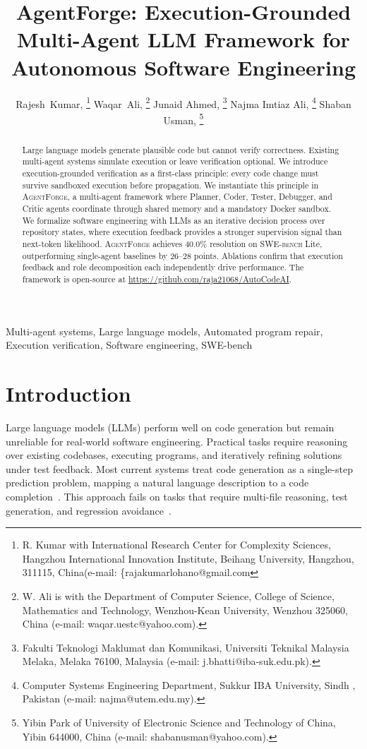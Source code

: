\documentclass[journal]{IEEEtran}
\title{AgentForge: Execution-Grounded Multi-Agent LLM Framework for Autonomous Software Engineering}
\author{
    Rajesh~Kumar, %
    \thanks{R. Kumar with International Research Center for Complexity Sciences, Hangzhou International Innovation Institute, Beihang University, Hangzhou, 311115, China(e-mail: \{rajakumarlohano@gmail.com}%
    Waqar~Ali, %
    \thanks{W. Ali is with the Department of Computer Science, College of Science, Mathematics and Technology, Wenzhou-Kean University, Wenzhou 325060, China (e-mail: waqar.uestc@yahoo.com).}%
    Junaid Ahmed,
     \thanks{Fakulti Teknologi Maklumat dan Komunikasi, 
Universiti Teknikal Malaysia Melaka, Melaka 76100, Malaysia (e-mail:  j.bhatti@iba-suk.edu.pk).}
    Najma Imtiaz Ali,
     \thanks{Computer Systems Engineering Department, Sukkur IBA University, Sindh , Pakistan (e-mail:  najma@utem.edu.my).}
Shaban Usman,
     \thanks{Yibin Park of University of Electronic Science and Technology of China, Yibin 644000, China (e-mail:  shabanusman@yahoo.com).}


}
\newcommand{\agentforge}{\textsc{AgentForge}}
\newcommand{\swebench}{\textsc{SWE-bench}}
\begin{document}
\maketitle

\begin{abstract}
Large language models generate plausible code but cannot verify correctness. Existing multi-agent systems simulate execution or leave verification optional. We introduce execution-grounded verification as a first-class principle: every code change must survive sandboxed execution before propagation. We instantiate this principle in \agentforge{}, a multi-agent framework where Planner, Coder, Tester, Debugger, and Critic agents coordinate through shared memory and a mandatory Docker sandbox. We formalize software engineering with LLMs as an iterative decision process over repository states, where execution feedback provides a stronger supervision signal than next-token likelihood. \agentforge{} achieves 40.0\% resolution on \swebench{} Lite, outperforming single-agent baselines by 26--28 points. Ablations confirm that execution feedback and role decomposition each independently drive performance. The framework is open-source at \url{https://github.com/raja21068/AutoCodeAI}.
\end{abstract}

\begin{IEEEkeywords}
Multi-agent systems, Large language models, Automated program repair, Execution verification, Software engineering, SWE-bench
\end{IEEEkeywords}

\section{Introduction}
\label{sec:intro}

Large language models (LLMs) perform well on code generation but remain unreliable for real-world software engineering. Practical tasks require reasoning over existing codebases, executing programs, and iteratively refining solutions under test feedback. Most current systems treat code generation as a single-step prediction problem, mapping a natural language description to a code completion~\cite{brown2020language}. This approach fails on tasks that require multi-file reasoning, test generation, and regression avoidance~\cite{chen2021codex}.
\end{document}
